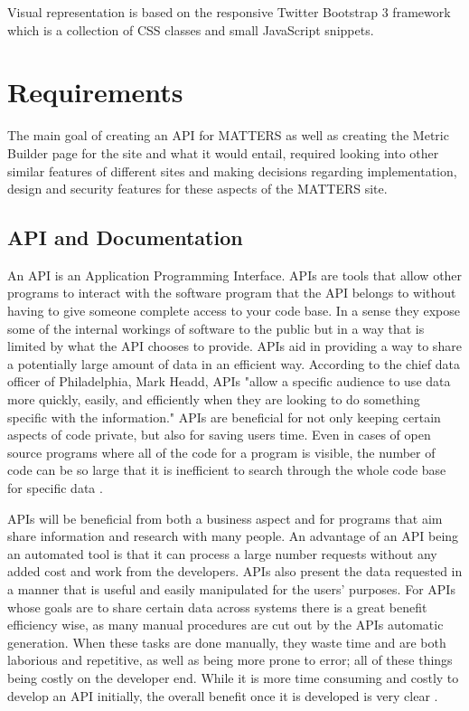 			Visual representation is based on the responsive Twitter Bootstrap 3 framework 
			which is a collection of CSS classes and small JavaScript snippets. 

	\section{Requirements}

		The main goal of creating an API for MATTERS as well as creating the Metric 
		Builder page for the site and what it would entail, required looking into other 
		similar features of different sites and making decisions regarding implementation,
		design and security features for these aspects of the MATTERS site.

	\subsection{API and Documentation}

		An API is an Application Programming Interface. APIs are tools that allow other 
		programs to interact with the software program that the API belongs to without 
		having to give someone complete access to your code base. In a sense they expose 
		some of the internal workings of software to the public but in a way that is 
		limited by what the API chooses to provide. APIs aid in providing a way to share 
		a potentially large amount of data in an efficient way. According to the chief 
		data officer of Philadelphia, Mark Headd, APIs "allow a specific audience to use 
		data more quickly, easily, and efficiently when they are looking to do something 
		specific with the information." APIs are beneficial for not only keeping certain 
		aspects of code private, but also for saving users time. Even in cases of open 
		source programs where all of the code for a program is visible, the number of 
		code can be so large that it is inefficient to search through the whole code base 
		for specific data \cite{govapi}. 

		APIs will be beneficial from both a business aspect and for programs that aim share 
		information and research with many people. An advantage of an API being an automated 
		tool is that it can process a large number requests without any added cost and work 
		from the developers. APIs also present the data requested in a manner that is useful 
		and easily manipulated for the users' purposes. For APIs whose goals are to share 
		certain data across systems there is a great benefit efficiency wise, as many manual 
		procedures are cut out by the APIs automatic generation. When these tasks are done 
		manually, they waste time and are both laborious and repetitive, as well as being more 
		prone to error; all of these things being costly on the developer end. While it is more 
		time consuming and costly to develop an API initially, the overall benefit once it is 
		developed is very clear \cite{govapi}.

